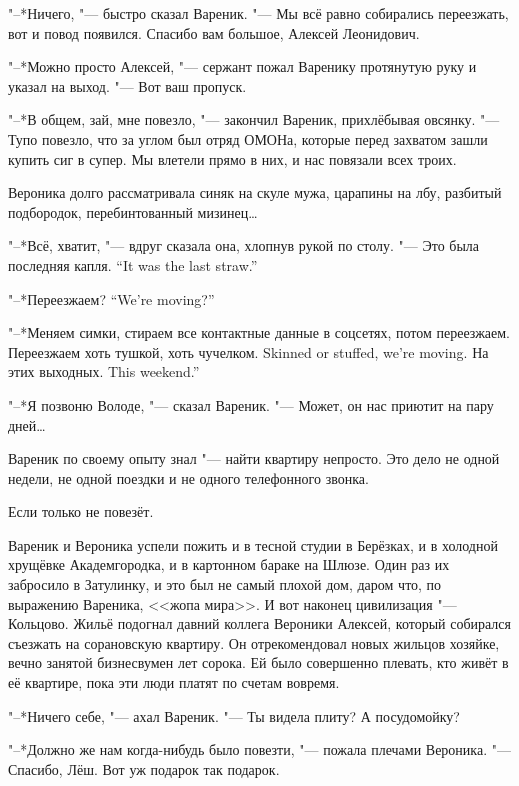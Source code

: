 "--*Ничего, "--- быстро сказал Вареник.
"--- Мы всё равно собирались переезжать, вот и повод появился.
Спасибо вам большое, Алексей Леонидович.

"--*Можно просто Алексей, "--- сержант пожал Варенику протянутую руку и указал на выход.
"--- Вот ваш пропуск.

\asterism

\textspace

"--*В общем, зай, мне повезло, "--- закончил Вареник, прихлёбывая овсянку.
"--- Тупо повезло, что за углом был отряд ОМОНа, которые перед захватом зашли купить сиг в супер.
Мы влетели прямо в них, и нас повязали всех троих.

Вероника долго рассматривала синяк на скуле мужа, царапины на лбу, разбитый подбородок, перебинтованный мизинец\ldots{}

"--*Всё, хватит, "--- вдруг сказала она, хлопнув рукой по столу.
{"--- Это была последняя капля.}
{``It was the last straw.''}

{"--*Переезжаем?}
{``We're moving?''}

"--*Меняем симки, стираем все контактные данные в соцсетях, потом переезжаем.
{Переезжаем хоть тушкой, хоть чучелком.}
{Skinned or stuffed, we're moving.}
{На этих выходных.}
{This weekend.''}

"--*Я позвоню Володе, "--- сказал Вареник.
"--- Может, он нас приютит на пару дней\ldots{}

\asterism

\label{Thu_2012_06_07}

Вареник по своему опыту знал "--- найти квартиру непросто.
Это дело не одной недели, не одной поездки и не одного телефонного звонка.

Если только не повезёт.

Вареник и Вероника успели пожить и в тесной студии в Берёзках, и в холодной хрущёвке Академгородка, и в картонном бараке на Шлюзе.
Один раз их забросило в Затулинку, и это был не самый плохой дом, даром что, по выражению Вареника, <<жопа мира>>.
И вот наконец цивилизация "--- Кольцово.
Жильё подогнал давний коллега Вероники Алексей, который собирался съезжать на сорановскую квартиру.
Он отрекомендовал новых жильцов хозяйке, вечно занятой бизнесвумен лет сорока.
Ей было совершенно плевать, кто живёт в её квартире, пока эти люди платят по счетам вовремя.

"--*Ничего себе, "--- ахал Вареник.
"--- Ты видела плиту?
А посудомойку?

"--*Должно же нам когда-нибудь было повезти, "--- пожала плечами Вероника.
"--- Спасибо, Лёш.
Вот уж подарок так подарок.

